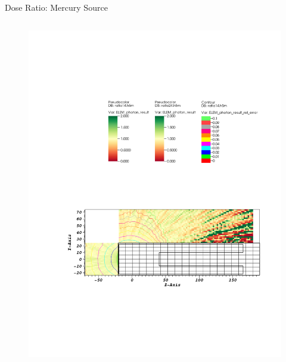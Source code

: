 \documentclass{beamer}
\begin{document}
\begin{frame}{Dose Ratio: Mercury Source}
\begin{columns}[T]

        \begin{figure}
                \centering
                \includegraphics[scale=0.49,trim={2.5cm 6cm 1cm 15cm},clip]{figs/ratio_mer_novoid.pdf}
        \end{figure}


\end{columns}
\end{frame}
\end{document}
